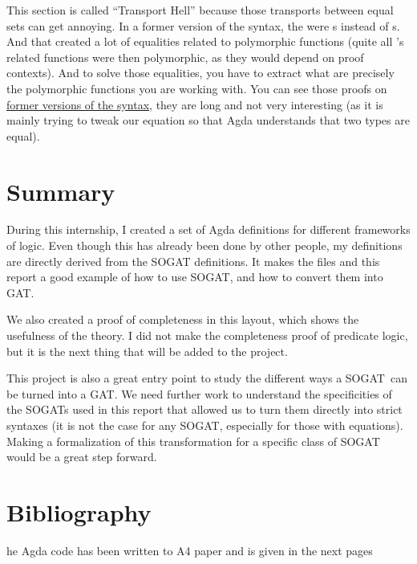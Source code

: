\documentclass[10pt,a4paper]{article}
\begin{document}
			This section is called \enquote{Transport Hell} because those transports between equal sets can get annoying. In a former version of the syntax, the  were s instead of s. And that created a lot of equalities related to polymorphic functions (quite all 's related functions were then polymorphic, as they would depend on proof contexts). And to solve those equalities, you have to extract what are precisely the polymorphic functions you are working with. You can see those proofs on \href{https://github.com/MysaaJava/m1-internship/commit/2728c60633a80631ed7b61bbfae5c81a1e0e193a#diff-99bc55bebd36ad0afbae3c6448793992086091c5b6b25973f73dd779690d7dd2}{former versions of the syntax}, they are long and not very interesting (as it is mainly trying to tweak our equation so that Agda understands that two types are equal).
	
	\section{Summary}
		
		During this internship, I created a set of Agda definitions for different frameworks of logic. Even though this has already been done by other people, my definitions are directly derived from the SOGAT definitions. It makes the files and this report a good example of how to use SOGAT, and how to convert them into GAT.
		
		We also created a proof of completeness in this layout, which shows the usefulness of the theory. I did not make the completeness proof of predicate logic, but it is the next thing that will be added to the project.
		
		This project is also a great entry point to study the different ways a SOGAT can be turned into a GAT. We need further work to understand the specificities of the SOGATs used in this report that allowed us to turn them directly into strict syntaxes (it is not the case for any SOGAT, especially for those with equations). Making a formalization of this transformation for a specific class of SOGAT would be a great step forward.
	
	
	
	\section{Bibliography}
	\begingroup
	\renewcommand{\section}[2]{}%
	\printbibliography
	\endgroup
	
	\newpage
	\addappheadtotoc
	\appendix
	\appendixpage
	
	\section{Agda Code}
	The Agda code has been written to A4 paper and is given in the next pages
	
\end{document}
